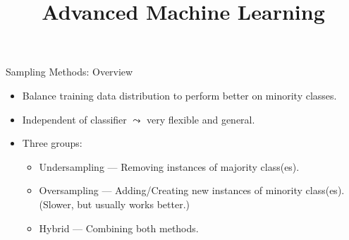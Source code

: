 \documentclass[11pt,compress,t,notes=noshow, xcolor=table]{beamer}
\title{Advanced Machine Learning}
\date{}
\begin{document}
	

\sloppy
	
\begin{frame}{Sampling Methods: Overview}
    \small{
		\begin{itemize}
			\item Balance training data distribution to perform better on minority classes.
			
			\item Independent of classifier $\leadsto$ very flexible and general.
   
			\item Three groups: 
		
			\begin{minipage}{0.59\textwidth}
				\begin{itemize} 
                    \small
                    
					\item Undersampling --- Removing instances of majority class(es).
			
					\item Oversampling --- Adding/Creating new instances of minority class(es).  (Slower, but usually works better.)


					\item Hybrid --- Combining both methods.
			

\end{itemize}
\end{minipage}
\end{itemize}}
\end{frame}
\end{document}
